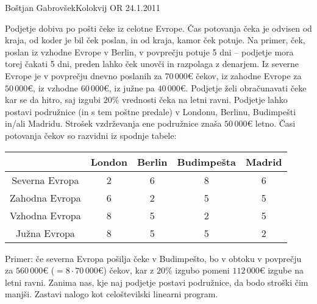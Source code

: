 \begin{naloga}{Boštjan Gabrovšek}{Kolokvij OR 24.1.2011}
\begin{vprasanje}
Podjetje dobiva po pošti čeke iz celotne Evrope.
Čas potovanja čeka je odvisen od kraja, od koder je bil ček poslan,
in od kraja, kamor ček potuje.
Na primer, ček, poslan iz vzhodne Evrope v Berlin, v povprečju potuje 5 dni
-- podjetje mora torej čakati 5 dni,
preden lahko ček unovči in razpolaga z denarjem.
Iz severne Evrope je v povprečju dnevno poslanih za $70\,000 €$ čekov,
iz zahodne Evrope za $50\,000 €$, iz vzhodne $60\,000 €$,
iz južne pa $40\,000 €$.
Podjetje želi obračunavati čeke kar se da hitro,
saj izgubi $20\%$ vrednosti čeka na letni ravni.
Podjetje lahko postavi podružnice (in s tem poštne predale)
v Londonu, Berlinu, Budimpešti in/ali Madridu.
Strošek vzdrževanja ene podružnice znaša $50\,000 €$ letno.
Časi potovanja čekov so razvidni iz spodnje tabele:
\begin{center}
\begin{tabular}{c|cccc}
& London & Berlin & Budimpešta & Madrid \\ \hline
Severna Evropa & 2 & 6 & 8 & 6 \\
Zahodna Evropa & 6 & 2 & 5 & 5 \\
Vzhodna Evropa & 8 & 5 & 2 & 5 \\
Južna Evropa   & 8 & 5 & 5 & 2
\end{tabular}
\end{center}
Primer: če severna Evropa pošilja čeke v Budimpešto,
bo v obtoku v pov\-preč\-ju za $560\,000 €$ ($= 8 \cdot 70\,000 €$) čekov,
kar z $20\%$ izgubo pomeni $112\,000 €$ izgube na letni ravni.
Zanima nas, kje naj podjetje postavi podružnice, da bodo stroški čim manjši.
Zastavi nalogo kot celoštevilski linearni program.
\end{vprasanje}


\end{naloga}
